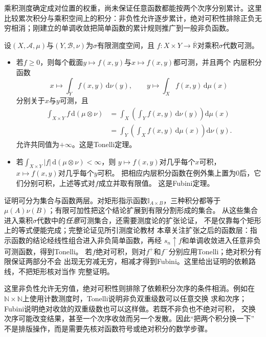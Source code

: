 乘积测度确定成对位置的权重，尚未保证任意函数都能按两个次序分别累计。这里比较累次积分与乘积空间上的积分：非负性允许逐步累计，绝对可积性排除正负无穷相消；刚建立的单调收敛把简单函数的累计规则推广到一般非负函数。
\begin{theorem}[Tonelli与Fubini定理]
\label{thm:analysis-tonelli-fubini}
设$(X,\mathcal{A},\mu)$与$(Y,\mathcal{B},\nu)$为$\sigma$有限测度空间，且 $f:X\times Y\to\overline{\mathbb{R}}$对乘积$\sigma$代数可测。
\begin{itemize}

\item 若$f\geq0$，则每个截面$y\mapsto f(x,y)$与$x\mapsto f(x,y)$都可测，并且两个
  内层积分函数
  \[
    x\longmapsto\int_Yf(x,y)\,\mathrm{d}\nu(y),
    \qquad
    y\longmapsto\int_Xf(x,y)\,\mathrm{d}\mu(x)
  \]
  分别关于$x$与$y$可测，且
  \[
    \begin{aligned}
      \int_{X\times Y}f\,\mathrm{d}(\mu\otimes\nu)
      &=
      \int_X\left(\int_Yf(x,y)\,\mathrm{d}\nu(y)\right)\mathrm{d}\mu(x)\\
      &=
      \int_Y\left(\int_Xf(x,y)\,\mathrm{d}\mu(x)\right)\mathrm{d}\nu(y).
    \end{aligned}
  \]
  允许共同值为$+\infty$。这是Tonelli定理。
\item 若$\int_{X\times Y}|f|\,\mathrm{d}(\mu\otimes\nu)<\infty$，则
  $y\mapsto f(x,y)$对几乎每个$x$可积，$x\mapsto f(x,y)$对几乎每个$y$可积。
  把相应内层积分函数在例外集上置为$0$后，它们分别可积，上述等式对$f$成立并取有限值。
  这是Fubini定理。
\end{itemize}
\end{theorem}

证明可分为集合与函数两层。对矩形指示函数$\mathbb I_{A\times B}$，三种积分都等于
$\mu(A)\nu(B)$；有限可加性把这个结论扩展到有限分割形成的集合。
从这些集合进入乘积$\sigma$代数中的\emph{任意}可测集合，还需要测度论的扩张论证，
不是仅靠每个矩形上的等式便能完成；完整论证见所引测度论教材
本章关注扩张之后的函数层：指示函数的结论经线性组合进入非负简单函数，再经
$s_n\uparrow f$和单调收敛进入任意非负可测函数，得到Tonelli。
若$f$绝对可积，则对$f^+$和$f^-$分别应用Tonelli；绝对积分有限保证两部分不会
出现无穷减无穷，相减才得到Fubini。这里给出证明的依赖路线，不把矩形核对当作
完整证明。

这里非负性允许无穷值，绝对可积性则排除了依赖积分次序的条件相消。例如在
$\mathbb{N}\times\mathbb{N}$上使用计数测度时，Tonelli说明非负双重级数可以任意交换
求和次序；Fubini说明绝对收敛的双重级数也可以这样做。若既不非负也不绝对可积，
交换次序可能改变结果，甚至一个次序收敛而另一个发散。因此“把两个积分换一下”
不是排版操作，而是需要先核对函数符号或绝对积分的数学步骤。

